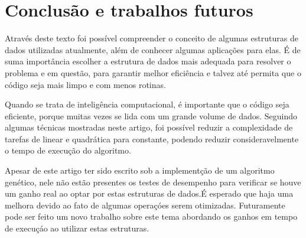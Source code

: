 \documentclass[12pt]{article}
\begin{document}
\section{Conclus\~{a}o e trabalhos futuros}

Atrav\'{e}s deste texto foi poss\'{i}vel compreender o conceito de algumas estruturas de dados utilizadas
atualmente, al\'{e}m de conhecer algumas aplica\c{c}\~{o}es para elas. \'{E} de suma import\^{a}ncia escolher a estrutura
de dados mais adequada para resolver o problema e em quest\~{a}o, para garantir melhor efici\^{e}ncia e talvez at\'{e}
permita que o c\'{o}digo seja mais limpo e com menos rotinas.

Quando se trata de intelig\^{e}ncia computacional, \'{e} importante que o c\'{o}digo seja eficiente, porque muitas
vezes se lida com um grande volume de dados. Seguindo algumas t\'{e}cnicas mostradas neste artigo, foi poss\'{i}vel
reduzir a complexidade de tarefas de linear e quadr\'{a}tica para constante, podendo reduzir consideravelmente o tempo de
execu\c{c}\~{a}o do algoritmo.

Apesar de este artigo ter sido escrito sob a implement\c{c}\~{a}o de um algoritmo gen\'{e}tico, nele n\~{a}o est\~{a}o
presentes os testes de desempenho para verificar se houve um ganho real ao optar por estas estruturas de dados.\'{E} esperado
que haja uma melhora devido ao fato de algumas opera\c{c}\'{o}es serem otimizadas. Futuramente pode ser feito um novo
trabalho sobre este tema abordando os ganhos em tempo de execu\c{c}\'{a}o ao utilizar estas estruturas.



\end{document}
